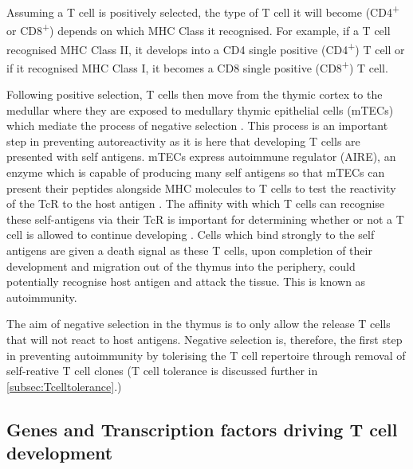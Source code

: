 Assuming a T cell is positively selected, the type of T cell it will become (CD4\textsuperscript{+} or CD8\textsuperscript{+}) depends on which MHC Class it recognised.
For example, if a T cell recognised MHC Class II, it develops into a CD4 single positive (CD4\textsuperscript{+}) T cell or if it recognised MHC Class I, it becomes a CD8 single positive (CD8\textsuperscript{+}) T cell.

Following positive selection, T cells then move from the thymic cortex to the medullar where they are exposed to medullary thymic epithelial cells (mTECs) which mediate the process of negative selection \citep{Starr2003}.
This process is an important step in preventing autoreactivity as it is here that developing T cells are presented with self antigens.
mTECs express autoimmune regulator (AIRE), an enzyme which is capable of producing many self antigens so that mTECs can present their peptides alongside MHC molecules to T cells to test the reactivity of the TcR to the host antigen \citep{Anderson2011}.
The affinity with which T cells can recognise these self-antigens via their TcR is important for determining whether or not a T cell is allowed to continue developing \citep{Ashton1994}.
Cells which bind strongly to the self antigens are given a death signal as these T cells, upon completion of their development and migration out of the thymus into the periphery, could potentially recognise host antigen and attack the tissue.
This is known as autoimmunity.

The aim of negative selection in the thymus is to only allow the release T cells that will not react to host antigens.
Negative selection is, therefore, the first step in preventing autoimmunity by tolerising the T cell repertoire through removal of self-reative T cell clones \citep{Walker2002}
(T cell tolerance is discussed further in \cref{subsec:Tcelltolerance}.)


\subsection{Genes and Transcription factors driving T cell development}
\label{subsec:Tcellgenes}

